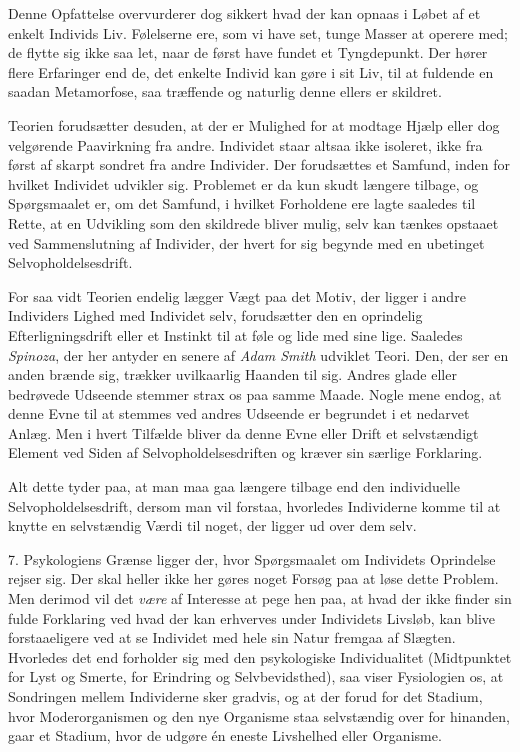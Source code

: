 \documentclass[12pt,a4paper,openany]{book}
\newcommand{\opage}[1]{\marginnote{\footnotesize\textit{[#1]}}}
\begin{document}
Denne Opfattelse overvurderer dog sikkert hvad der kan opnaas i Løbet af
et enkelt Individs Liv. Følelserne ere, som vi have set, tunge Masser at
operere med; de flytte sig ikke saa let, naar de først have fundet et
Tyngdepunkt. Der hører flere Erfaringer end de, det enkelte Individ kan
gøre i sit Liv, til at fuldende en saadan Metamorfose, saa træffende og
naturlig denne ellers er skildret.


\opage{296}Teorien forudsætter desuden, at der er Mulighed for at
modtage Hjælp eller dog velgørende Paavirkning fra andre. Individet
staar altsaa ikke isoleret, ikke fra først af skarpt sondret fra andre
Individer. Der forudsættes et Samfund, inden for hvilket Individet
udvikler sig. Problemet er da kun skudt længere tilbage, og Spørgsmaalet
er, om det Samfund, i hvilket Forholdene ere lagte saaledes til Rette,
at en Udvikling som den skildrede bliver mulig, selv kan tænkes opstaaet
ved Sammenslutning af Individer, der hvert for sig begynde med en
ubetinget Selvopholdelsesdrift.

For saa vidt Teorien endelig lægger Vægt paa det Motiv, der ligger i
andre Individers Lighed med Individet selv, forudsætter den en
oprindelig Efterligningsdrift eller et Instinkt til at føle og lide med
sine lige. Saaledes \emph{Spinoza}, der her antyder en senere af
\emph{Adam Smith} udviklet Teori. Den, der ser en anden brænde sig,
trækker uvilkaarlig Haanden til sig. Andres glade eller bedrøvede
Udseende stemmer strax os paa samme Maade. Nogle mene endog, at denne
Evne til at stemmes ved andres Udseende er begrundet i et nedarvet
Anlæg. Men i hvert Tilfælde bliver da denne Evne eller Drift et
selvstændigt Element ved Siden af Selvopholdelsesdriften og kræver sin
særlige Forklaring.

Alt dette tyder paa, at man maa gaa længere tilbage end den individuelle
Selvopholdelsesdrift, dersom man vil forstaa, hvorledes Individerne
komme til at knytte en selvstændig Værdi til noget, der ligger ud over
dem selv.

7. Psykologiens Grænse ligger der, hvor Spørgsmaalet om Individets
Oprindelse rejser sig. Der skal heller ikke her gøres noget Forsøg paa
at løse dette Problem. Men derimod vil det \emph{være} af Interesse at
pege hen paa, at hvad der ikke finder sin fulde Forklaring ved hvad der
kan erhverves under Individets Livsløb, kan blive forstaaeligere ved at
se Individet med hele sin Natur fremgaa af Slægten. Hvorledes det end
forholder sig med den psykologiske Individualitet (Midtpunktet for Lyst
og Smerte, for Erindring og Selvbevidsthed), saa viser Fysiologien os,
at Sondringen mellem Individerne sker gradvis, og at der forud for det
Stadium, hvor Moderorganismen og den nye Organisme staa selvstændig over
for hinanden, gaar et Stadium, hvor de udgøre én eneste Livshelhed eller
Organisme.
\end{document}
